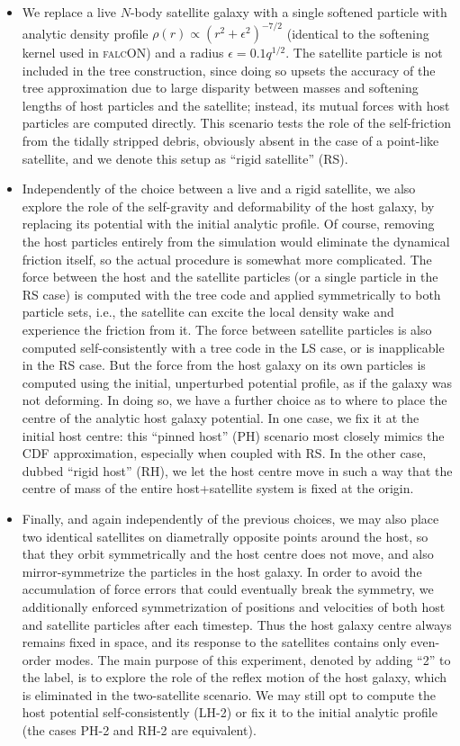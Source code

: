 \documentclass[twocolumn]{aastex63}
\newcommand{\LH}{\textsf{L\!H}\xspace}
\newcommand{\RH}{\textsf{R\!H}\xspace}
\newcommand{\PH}{\textsf{P\!H}\xspace}
\newcommand{\LS}{\textsf{L\!S}\xspace}
\newcommand{\RS}{\textsf{R\!S}\xspace}
\begin{document}
\begin{itemize}
\item We replace a live $N$-body satellite galaxy with a single softened particle with analytic density profile $\rho(r) \propto (r^2+\epsilon^2)^{-7/2}$ (identical to the softening kernel used in \textsc{falcON}) and a radius $\epsilon=0.1q^{1/2}$. The satellite particle is not included in the tree construction, since doing so upsets the accuracy of the tree approximation due to large disparity between masses and softening lengths of host particles and the satellite; instead, its mutual forces with host particles are computed directly. This scenario tests the role of the self-friction from the tidally stripped debris, obviously absent in the case of a point-like satellite, and we denote this setup as ``rigid satellite'' (\RS).
%
\item Independently of the choice between a live and a rigid satellite, we also explore the role of the self-gravity and deformability of the host galaxy, by replacing its potential with the initial analytic profile. Of course, removing the host particles entirely from the simulation would eliminate the dynamical friction itself, so the actual procedure is somewhat more complicated. The force between the host and the satellite particles (or a single particle in the \RS case) is computed with the tree code and applied symmetrically to both particle sets, i.e., the satellite can excite the local density wake and experience the friction from it. The force between satellite particles is also computed self-consistently with a tree code in the \LS case, or is inapplicable in the \RS case. But the force from the host galaxy on its own particles is computed using the initial, unperturbed potential profile, as if the galaxy was not deforming. In doing so, we have a further choice as to where to place the centre of the analytic host galaxy potential. In one case, we fix it at the initial host centre: this ``pinned host'' (\PH) scenario most closely mimics the CDF approximation, especially when coupled with \RS. In the other case, dubbed ``rigid host'' (\RH), we let the host centre move in such a way that the centre of mass of the entire host+satellite system is fixed at the origin.
%
\item Finally, and again independently of the previous choices, we may also place two identical satellites on diametrally opposite points around the host, so that they orbit symmetrically and the host centre does not move, and also mirror-symmetrize the particles in the host galaxy. In order to avoid the accumulation of force errors that could eventually break the symmetry, we additionally enforced symmetrization of positions and velocities of both host and satellite particles after each timestep. Thus the host galaxy centre always remains fixed in space, and its response to the satellites contains only even-order modes. The main purpose of this experiment, denoted by adding ``2'' to the label, is to explore the role of the reflex motion of the host galaxy, which is eliminated in the two-satellite scenario. We may still opt to compute the host potential self-consistently (\LH-2) or fix it to the initial analytic profile (the cases \PH-2 and \RH-2 are equivalent).
\end{itemize}
\end{document}
